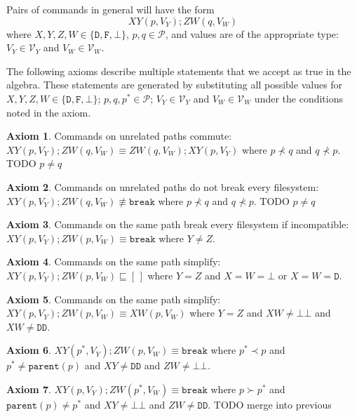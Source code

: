 \documentclass[12pt]{article}
\newcommand{\setvx}[1]{\mathcal{V}_{#1}}
\newcommand{\setp}{\mathcal{P}}
\newcommand{\empt}{\bot}
\newcommand{\parent}{\mathtt{parent}}
\newcommand{\pp}{p^*} %
\newcommand{\cbrk}{\mathtt{break}}
\newcommand{\fscommand}[2]{{#1#2}}
\newcommand{\fsregcommandchar}[1]{\mathtt{#1}}
\newcommand{\fsregcommand}[2]{\fscommand{\fsregcommandchar{#1}}{\fsregcommandchar{#2}}}
\newcommand{\cbb}{\fsregcommand{\empt}{\empt}}
\newcommand{\cdd}{\fsregcommand{D}{D}}
\newcommand{\cxy}{\fscommand{X}{Y}}
\newcommand{\cxw}{\fscommand{X}{W}}
\newcommand{\czw}{\fscommand{Z}{W}}
\newcommand{\typeset}{\{\fsregcommandchar{D},\fsregcommandchar{F},\empt\}}
\newcommand{\descendant}{\prec}
\newcommand{\ancestor}{\succ}
\newcommand{\eqext}{\sqsubseteq}
\newcommand{\nequiv}{\not\equiv}
\newcommand{\emptyseq}{[\,]}
\theoremstyle{definition}
\newtheorem{myax}{Axiom}
\begin{document}
Pairs of commands in general will have the form
\[ \cxy(p,V_Y); \czw(q,V_W) \]
where $X,Y,Z,W\in\typeset$, $p,q\in\setp$, 
and values are of the appropriate type: 
$V_Y\in\setvx{Y}$ and $V_W\in\setvx{W}$.

The following axioms describe multiple statements
that we accept as true in the algebra.
These statements are generated by substituting 
all possible values for
$X,Y,Z,W\in\typeset$; $p,q,\pp\in\setp$; $V_Y\in\setvx{Y}$ and $V_W\in\setvx{W}$
under the conditions noted in the axiom.


\begin{myax}\label{ax_separate_commute}
Commands on unrelated paths commute:
$\cxy(p,V_Y); \czw(q,V_W) \equiv \czw(q,V_W); \cxy(p,V_Y)$ where $p\not\descendant q$ and $q\not\descendant p$.
TODO $p\neq q$
\end{myax}

\begin{myax}\label{ax_separate_nobreaks}
Commands on unrelated paths do not break every filesystem:
$\cxy(p,V_Y); \czw(q,V_W) \nequiv \cbrk$ where $p\not\descendant q$ and $q\not\descendant p$.
TODO $p\neq q$
\end{myax}


\begin{myax}\label{ax_same_breaks}
Commands on the same path break every filesystem if incompatible:
$\cxy(p,V_Y); \czw(p,V_W) \equiv \cbrk$ where $Y\ne Z$.
\end{myax}

\begin{myax}\label{ax_same_emptyseq}
Commands on the same path simplify:
$\cxy(p,V_Y); \czw(p,V_W) \eqext \emptyseq$ where $Y=Z$ and $X=W=\fsregcommandchar{\empt}$ or $X=W=\fsregcommandchar{D}$.
\end{myax}

\begin{myax}\label{ax_same_singlec}
Commands on the same path simplify:
$\cxy(p,V_Y); \czw(p,V_W) \equiv \cxw(p,V_W)$ where $Y=Z$ and $XW\neq\cbb$ and $XW\neq\cdd$.
\end{myax}

\begin{myax}\label{ax_distantchild_breaks}
$\cxy(\pp,V_Y); \czw(p,V_W) \equiv \cbrk$ where $\pp\descendant p$ and $\pp\neq\parent(p)$ and $\cxy\neq\cdd$ and $\czw\neq\cbb$.
\end{myax}

\begin{myax}\label{ax_distantparent_breaks}
$\cxy(p,V_Y); \czw(\pp,V_W) \equiv \cbrk$ where $p\ancestor \pp$ and $\parent(p)\neq \pp$ and $\cxy\neq\cbb$ and $\czw\neq\cdd$.
TODO merge into previous
\end{myax}
\end{document}
